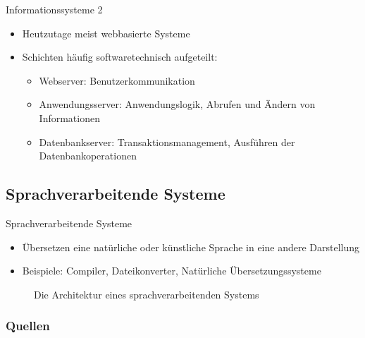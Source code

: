 \documentclass{beamer}
\begin{document}
			\begin{frame}{Informationssysteme 2}
			\begin{itemize}
				\item Heutzutage meist webbasierte Systeme
				\item Schichten häufig softwaretechnisch aufgeteilt:
				\begin{itemize}
					\item Webserver: Benutzerkommunikation
					\item Anwendungsserver: Anwendungslogik, Abrufen und Ändern von Informationen
					\item Datenbankserver: Transaktionsmanagement, Ausführen der Datenbankoperationen
				\end{itemize}
			\end{itemize}
			\end{frame}
			
		\subsection{Sprachverarbeitende Systeme}
			\begin{frame}{Sprachverarbeitende Systeme}
				\begin{itemize}
					\item Übersetzen eine natürliche oder künstliche Sprache in eine andere Darstellung \cite[S. 207]{sommer}
					\item Beispiele: Compiler, Dateikonverter, Natürliche Übersetzungssysteme
				\end{itemize}
			\begin{figure}
				\caption{Die Architektur eines sprachverarbeitenden Systems\cite[S. 208]{sommer}}
			\end{figure}
			
				
			\end{frame}
	\begin{frame}[allowframebreaks]
		\frametitle{Quellen}
		\printbibliography[heading=none]
	\end{frame}
\end{document}
